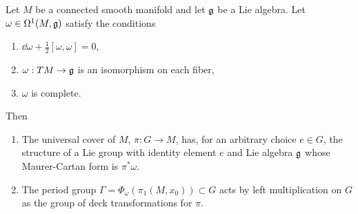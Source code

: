 \begin{thm}\label{thm 8.7 Sharpe}
    Let $M$ be a connected smooth manifold and let $\mathfrak{g}$ be a Lie algebra. Let $\omega\in\Omega^1(M,\mathfrak{g})$ satisfy the conditions
    \begin{enumerate}[label=(\roman*)]
        \item $\dd\omega+\frac12[\omega,\omega]=0$,
        \item $\omega:TM\to \mathfrak{g}$ is an isomorphism on each fiber,
        \item $\omega$ is complete.
    \end{enumerate}
    Then
    \begin{enumerate}[label=(\alph*)]
        \item The universal cover of $M$, $\pi:G\to M$, has, for an arbitrary choice $e\in G$, the structure of a Lie group with identity element $e$ and Lie algebra $\mathfrak{g}$ whose Maurer-Cartan form is $\pi^\ast\omega$.
        \item The period group $\Gamma=\Phi_\omega(\pi_1(M,x_0))\subset G$ acts by left multiplication on $G$ as the group of deck transformations for $\pi$.
    \end{enumerate}
\end{thm}
